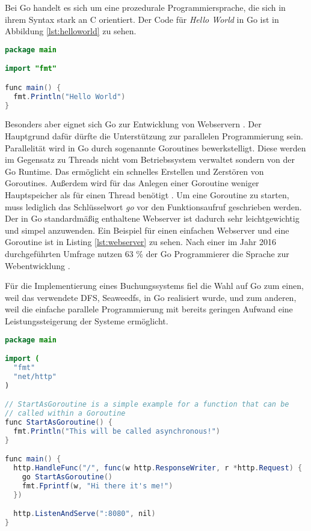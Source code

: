 \documentclass[12pt,oneside,a4paper,parskip]{scrbook}
\begin{document}
Bei Go handelt es sich um eine prozedurale Programmiersprache, die sich in ihrem Syntax stark an C orientiert. Der Code für \textit{Hello World} in Go ist in Abbildung \ref{lst:helloworld} zu sehen.
\begin{lstlisting}[label=lst:helloworld,
           language=Java,
           firstnumber=1,
           caption=Hello World mit Go.]           
package main

import "fmt"

func main() {
  fmt.Println("Hello World")
}

\end{lstlisting}

Besonders aber eignet sich Go zur Entwicklung von Webservern \cite[3-22]{gowebprogramming}. Der Hauptgrund dafür dürfte die Unterstützung zur parallelen Programmierung sein. Parallelität wird in Go durch sogenannte Goroutines bewerkstelligt. Diese werden im Gegensatz zu Threads nicht vom Betriebssystem verwaltet sondern von der Go Runtime. Das ermöglicht ein schnelles Erstellen und Zerstören von Goroutines. Außerdem wird für das Anlegen einer Goroutine weniger Hauptspeicher als für einen Thread benötigt \cite{goroutines}. Um eine Goroutine zu starten, muss lediglich das Schlüsselwort \textit{go} vor den Funktionsaufruf geschrieben werden. Der in Go standardmäßig  enthaltene Webserver ist dadurch sehr leichtgewichtig und simpel anzuwenden. Ein Beispiel für einen einfachen Webserver und eine Goroutine ist in Listing \ref{lst:webserver} zu sehen. Nach einer im Jahr 2016 durchgeführten Umfrage nutzen 63 \% der Go Programmierer die Sprache zur Webentwicklung \cite{gosurvey}.

Für die Implementierung eines Buchungssystems fiel die Wahl auf Go zum einen, weil das verwendete DFS, Seaweedfs, in Go realisiert wurde, und zum anderen, weil die einfache parallele Programmierung mit bereits geringen Aufwand eine Leistungssteigerung der Systeme ermöglicht.

\begin{minipage}{\linewidth}
\begin{lstlisting}[label=lst:webserver,
           language=Java,
           firstnumber=1,
           caption=Einfacher Webserver in Go und Beispiel einer Goroutine.]           
package main

import (
  "fmt"
  "net/http"
)

// StartAsGoroutine is a simple example for a function that can be 
// called within a Goroutine
func StartAsGoroutine() {
  fmt.Println("This will be called asynchronous!")
}

func main() {
  http.HandleFunc("/", func(w http.ResponseWriter, r *http.Request) {
    go StartAsGoroutine()
    fmt.Fprintf(w, "Hi there it's me!")
  })

  http.ListenAndServe(":8080", nil)
}
\end{lstlisting}
\end{minipage}
\end{document}
